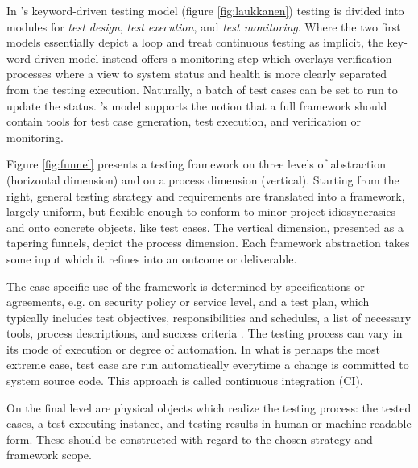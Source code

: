 \documentclass[12pt,a4paper,oneside,pdftex]{report}
\begin{document}
{In \citeauthor{laukkanen2006data}'s \citeyearpar{laukkkanen2005data} keyword-driven testing model (figure \ref{fig:laukkanen}) testing is divided into modules for \emph{test design}, \emph{test execution}, and \emph{test monitoring}. Where the two first models essentially depict a loop and treat continuous testing as implicit, the key-word driven model instead offers a monitoring step which overlays verification processes where a view to system status and health is more clearly separated from the testing execution. Naturally, a batch of test cases can be set to run to update the status. \citeauthor{laukkanen2006data}'s \citeyearpar{laukkkanen2005data} model supports the notion that a full framework should contain tools for test case generation, test execution, and verification or monitoring.

Figure \ref{fig:funnel} presents a testing framework on three levels of abstraction (horizontal dimension) and on a process dimension (vertical). Starting from the right, general testing strategy and requirements are translated into a framework, largely uniform, but flexible enough to conform to minor project idiosyncrasies and onto concrete objects, like test cases. The vertical dimension, presented as a tapering funnels, depict the process dimension. Each framework abstraction takes some input which it refines into an outcome or deliverable.

The case specific use of the framework is determined by specifications or agreements, e.g. on security policy or service level, and a test plan, which typically includes test objectives, responsibilities and schedules, a list of necessary tools, process descriptions, and success criteria \citep{myers1976software}. The testing process can vary in its mode of execution or degree of automation. In what is perhaps the most extreme case, test case are run automatically everytime a change is committed to system source code. This approach is called continuous integration (CI). 

On the final level are physical objects which realize the testing process: the tested cases, a test executing instance, and testing results in human or machine readable form. These should be constructed with regard to the chosen strategy and framework scope. 

\begin{figure}[H]
\centering
{}
\end{figure}}
\end{document}
